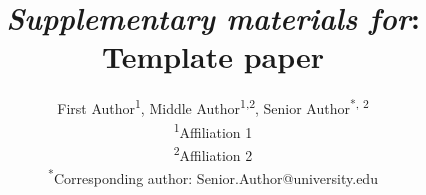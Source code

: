 \documentclass{article}
\title{\textit{Supplementary materials for}: Template paper}
\author{First Author\textsuperscript{1}, Middle Author\textsuperscript{1,2}, Senior Author\textsuperscript{*, 2}\\\textsuperscript{1}Affiliation 1\\\textsuperscript{2}Affiliation 2\\\textsuperscript{*}Corresponding author: Senior.Author@university.edu}
\begin{document}
\renewcommand{\figurename}{Supplementary Figure}


\setcounter{equation}{0}
\setcounter{figure}{0}
\setcounter{table}{0}
\setcounter{page}{1}
\setcounter{section}{0}
\makeatletter
\renewcommand{\theequation}{S\arabic{equation}}
\renewcommand{\thefigure}{S\arabic{figure}}
\renewcommand{\bibnumfmt}[1]{[S#1]}
\renewcommand{\citenumfont}[1]{S#1}

\maketitle


\newpage
\renewcommand{\refname}{Supplementary references}


\end{document}
